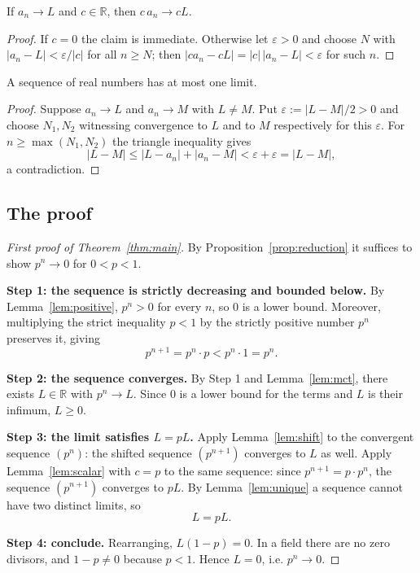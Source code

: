 \documentclass{essay}
\begin{document}
\begin{lemma}\label{lem:scalar}
If $a_{n} \to L$ and $c \in \mathbb{R}$, then $c\,a_{n} \to cL$.
\end{lemma}

\begin{proof}
If $c = 0$ the claim is immediate. Otherwise let $\varepsilon > 0$ and choose $N$
with $|a_{n} - L| < \varepsilon / |c|$ for all $n \geq N$; then
$|c a_{n} - cL| = |c|\,|a_{n} - L| < \varepsilon$ for such $n$.
\end{proof}

\begin{lemma}\label{lem:unique}
A sequence of real numbers has at most one limit.
\end{lemma}

\begin{proof}
Suppose $a_{n} \to L$ and $a_{n} \to M$ with $L \neq M$. Put
$\varepsilon := |L - M| / 2 > 0$ and choose $N_{1}, N_{2}$ witnessing convergence to
$L$ and to $M$ respectively for this $\varepsilon$. For $n \geq \max(N_{1}, N_{2})$
the triangle inequality gives
\[
  |L - M| \leq |L - a_{n}| + |a_{n} - M| < \varepsilon + \varepsilon = |L - M|,
\]
a contradiction.
\end{proof}

\subsection{The proof}

\begin{proof}[First proof of Theorem~\ref{thm:main}]
By Proposition~\ref{prop:reduction} it suffices to show $p^{n} \to 0$ for
$0 < p < 1$.

\medskip
\noindent\textbf{Step 1: the sequence is strictly decreasing and bounded below.}
By Lemma~\ref{lem:positive}, $p^{n} > 0$ for every $n$, so $0$ is a lower bound.
Moreover, multiplying the strict inequality $p < 1$ by the strictly positive number
$p^{n}$ preserves it, giving
\[
  p^{n+1} = p^{n} \cdot p < p^{n} \cdot 1 = p^{n}.
\]

\medskip
\noindent\textbf{Step 2: the sequence converges.}
By Step 1 and Lemma~\ref{lem:mct}, there exists $L \in \mathbb{R}$ with
$p^{n} \to L$. Since $0$ is a lower bound for the terms and $L$ is their infimum,
$L \geq 0$.

\medskip
\noindent\textbf{Step 3: the limit satisfies $L = pL$.}
Apply Lemma~\ref{lem:shift} to the convergent sequence $(p^{n})$: the shifted
sequence $(p^{n+1})$ converges to $L$ as well. Apply Lemma~\ref{lem:scalar} with
$c = p$ to the same sequence: since $p^{n+1} = p \cdot p^{n}$, the sequence
$(p^{n+1})$ converges to $pL$. By Lemma~\ref{lem:unique} a sequence cannot have two
distinct limits, so
\[
  L = pL.
\]

\medskip
\noindent\textbf{Step 4: conclude.}
Rearranging, $L(1 - p) = 0$. In a field there are no zero divisors, and
$1 - p \neq 0$ because $p < 1$. Hence $L = 0$, i.e. $p^{n} \to 0$.
\end{proof}
\end{document}
